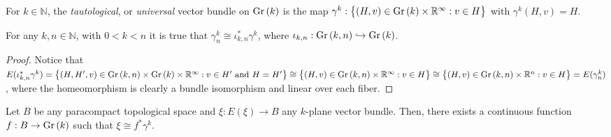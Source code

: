 \begin{definition} For $k\in\mathbb{N}$, the \emph{tautological}, or \emph{universal} vector bundle on $\Gr{k}$ is the map $\gamma^k:\big\{(H,v)\in\Gr{k}\times\mathbb{R}^{\infty}:v\in H\big\}$ with $\gamma^k(H,v)=H$.
\end{definition}

\begin{proposition}\label{prop:restriction} For any $k,n\in\mathbb{N}$, with $0<k<n$ it is true that $\gamma_n^k\cong\iota^*_{k,n}\gamma^k$, where $\iota_{k,n}:\Gr{k}{n}\hookrightarrow\Gr{k}$.
\end{proposition}
\begin{proof} Notice that $E(\iota_{k,n}^*\gamma^k)=\big\{(H,H',v)\in\Gr{k}{n}\times\Gr{k}\times\mathbb{R}^{\infty}:v\in H'\text{ and }H=H'\big\}\cong\big\{(H,v)\in\Gr{k}{n}\times\mathbb{R}^{\infty}:v\in H\big\}\cong\big\{(H,v)\in\Gr{k}{n}\times\mathbb{R}^n:v\in H\big\}=E(\gamma_n^k)$, where the homeomorphism is clearly a bundle isomorphism and linear over each fiber.
\end{proof}

\begin{theorem}\label{thm:universal} Let $B$ be any paracompact topological space and $\xi:E(\xi)\to B$ any $k$-plane vector bundle. Then, there exists a continuous function $f:B\to\Gr{k}$ such that $\xi\cong f^*\gamma^k$.
\end{theorem}

